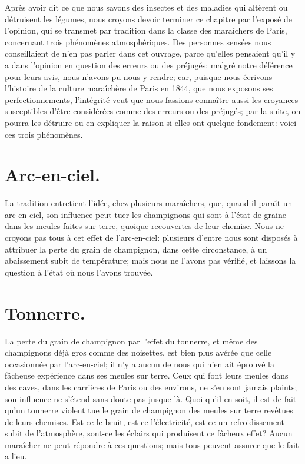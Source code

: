 \documentclass[10pt,a4paper]{book}
\begin{document}
Après avoir dit ce que nous savons des insectes et des maladies qui altèrent ou détruisent les légumes, nous croyons devoir terminer ce chapitre par l'exposé de l'opinion, qui se transmet par tradition dans la classe des maraîchers de Paris, concernant trois phénomènes atmosphériques. Des personnes sensées nous conseillaient de n'en pas parler dans cet ouvrage, parce qu'elles pensaient qu'il y a dans l'opinion en question des erreurs ou des préjugés: malgré notre déférence pour leurs avis, nous n'avons pu nous y rendre; car, puisque nous écrivons l'histoire de la culture maraîchère de Paris en 1844, que nous exposons ses perfectionnements, l'intégrité veut que nous fassions connaître aussi les croyances susceptibles d'être considérées comme des erreurs ou des préjugés; par la suite, on pourra les détruire ou en expliquer la raison si elles ont quelque fondement: voici ces trois phénomènes.

\section{Arc-en-ciel.}

La tradition entretient l'idée, chez plusieurs maraîchers, que, quand il paraît un arc-en-ciel, son influence peut tuer les champignons qui sont à l'état de graine dans les meules faites sur terre, quoique recouvertes de leur chemise. Nous ne croyons pas tous à cet effet de l'arc-en-ciel: plusieurs d'entre nous sont disposés à attribuer la perte du grain de champignon, dans cette circonstance, à un abaissement subit de température; mais nous ne l'avons pas vérifié, et laissons la question à l'état où nous l'avons trouvée.

\section{Tonnerre.}

La perte du grain de champignon par l'effet du tonnerre, et même des champignons déjà gros comme des noisettes, est bien plus avérée que celle occasionnée par l'arc-en-ciel; il n'y a aucun de nous qui n'en ait éprouvé la fâcheuse expérience dans ses meules sur terre. Ceux qui font leurs meules dans des caves, dans les carrières de Paris ou des environs, ne s'en sont jamais plaints; son influence ne s'étend sans doute pas jusque-là. Quoi qu'il en soit, il est de fait qu'un tonnerre violent tue le grain de champignon des meules sur terre revêtues de leurs chemises. Est-ce le bruit, est ce l'électricité, est-ce un refroidissement subit de l'atmosphère, sont-ce les éclairs qui produisent ce fâcheux effet? Aucun maraîcher ne peut répondre à ces questions; mais tous peuvent assurer que le fait a lieu.
\end{document}
